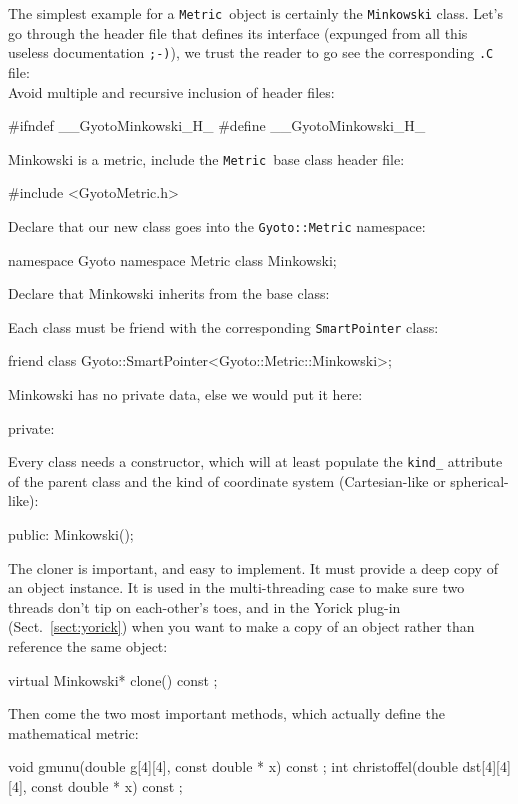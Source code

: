 \documentclass[a4paper,12pt]{article}
\newcommand{\Metric}{\texttt{Metric}}
\begin{document}
The simplest example for a \Metric\ object is certainly the
\texttt{Minkowski} class. Let's go through the header file that
defines its interface (expunged from all this useless documentation
\texttt{;-)}), we trust the reader to go see the corresponding
\texttt{.C} file:\\
Avoid multiple and recursive inclusion of header files:
\begin{code}
  #ifndef __GyotoMinkowski_H_
  #define __GyotoMinkowski_H_
\end{code}
Minkowski is a metric, include the \Metric\ base class header file:
\begin{code}
  #include <GyotoMetric.h>
\end{code}
Declare that our new class goes into the \texttt{Gyoto::Metric}
namespace:
\begin{code}
  namespace Gyoto {
    namespace Metric { class Minkowski; }
  }
\end{code}
Declare that Minkowski inherits from the base class:
\begin{code}
  class Gyoto::Metric::Minkowski
  : public Gyoto::Metric::Generic
  {
\end{code}
Each class must be friend with the corresponding \texttt{SmartPointer}
class:
\begin{code}
    friend class Gyoto::SmartPointer<Gyoto::Metric::Minkowski>;
\end{code}
Minkowski has no private data, else we would put it here:
\begin{code}
    private:

\end{code}
Every class needs a constructor, which will at least populate the
\texttt{kind\_} attribute of the parent class and the kind of coordinate
system (Cartesian-like or spherical-like):
\begin{code}
  public:
    Minkowski();
\end{code}
The cloner is important, and easy to implement. It must provide a deep
copy of an object instance. It is used in the multi-threading case to
make sure two threads don't tip on each-other's toes, and in the
Yorick plug-in (Sect.~\ref{sect:yorick}) when you want to make a copy
of an object rather than reference the same object:
\begin{code}
    virtual Minkowski* clone() const ;
\end{code}
Then come the two most important methods, which actually define the
mathematical metric:
\begin{code}
  void gmunu(double g[4][4], const double * x) const ;
  int christoffel(double dst[4][4][4], const double * x) const ;
\end{code}
\end{document}
